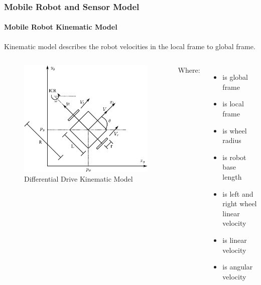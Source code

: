 \begin{frame}
	\frametitle{Mobile Robot and Sensor Model}
	\framesubtitle{Mobile Robot Kinematic Model}
	Kinematic model describes the robot velocities in the local frame to global frame.
	\begin{columns}
		\begin{figure}
			\caption{Differential Drive Kinematic Model}
			\includegraphics[scale=0.43]{image/DDWMR_kine.pdf}
		\end{figure}
		
		Where:
		\begin{itemize}
			\item { is global frame}
			\item { is local frame}
			\item { is wheel radius}
			\item { is robot base length}
			\item { is left and right wheel linear velocity}
			\item { is linear velocity}
			\item {\makebox[1cm]{\(\omega\)\hfill} is angular velocity }
		\end{itemize}
	\end{columns}
\end{frame}



